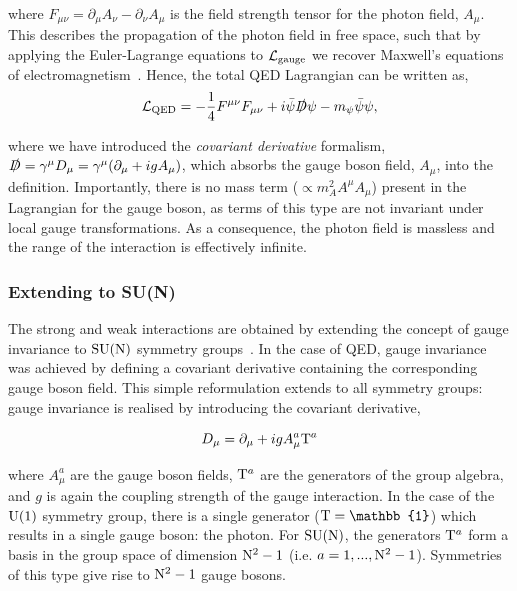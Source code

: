 \noindent
where $F_{\mu\nu}=\partial_{\mu}A_\nu-\partial_{\nu}A_\mu$ is the field strength tensor for the photon field, $A_\mu$. This describes the propagation of the photon field in free space, such that by applying the Euler-Lagrange equations to $\mathcal{L}_{\rm{gauge}}$ we recover Maxwell's equations of electromagnetism~\cite{Aitchison:2003tq}. Hence, the total QED Lagrangian can be written as, 
\begin{equation}
    \mathcal{L}_{\rm{QED}} = -\frac{1}{4}F^{\mu\nu}F_{\mu\nu} + i\bar{\psi}\slashed{D}\psi - m_{\psi}\bar{\psi}\psi,
\end{equation}

\noindent
where we have introduced the \textit{covariant derivative} formalism, $\slashed{D} = \gamma^{\mu}D_\mu = \gamma^{\mu}(\partial_{\mu}+igA_\mu)$, which absorbs the gauge boson field, $A_\mu$, into the definition. Importantly, there is no mass term ($\propto m_A^2 A^{\mu}A_\mu$) present in the Lagrangian for the gauge boson, as terms of this type are not invariant under local gauge transformations. As a consequence, the photon field is massless and the range of the interaction is effectively infinite.

\subsubsection{Extending to {\rm{SU}}(N)}
The strong and weak interactions are obtained by extending the concept of gauge invariance to ${\rm{SU}}({\rm{N}})$ symmetry groups~\cite{Aitchison:2004cs}. In the case of QED, gauge invariance was achieved by defining a covariant derivative containing the corresponding gauge boson field. This simple reformulation extends to all symmetry groups: gauge invariance is realised by introducing the covariant derivative, 

\begin{equation}
    D_\mu = \partial_\mu + i g A^a_\mu {\rm{T}}^a
\end{equation}

\noindent
where $A^a_\mu$ are the gauge boson fields, ${\rm{T}}^a$ are the generators of the group algebra, and $g$ is again the coupling strength of the gauge interaction. In the case of the ${\rm{U}}(1)$ symmetry group, there is a single generator (${\rm{T}}=\mathbb{1}$) which results in a single gauge boson: the photon. For ${\rm{SU}}({\rm{N}})$, the generators ${\rm{T}}^a$ form a basis in the group space of dimension ${\rm{N}}^2-1$ (i.e. $a=1,...,{\rm{N}}^2-1$). Symmetries of this type give rise to ${\rm{N}}^2-1$ gauge bosons.

